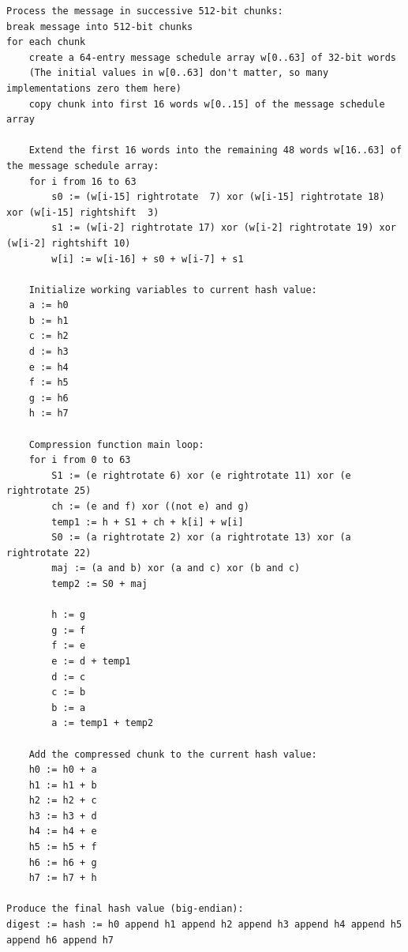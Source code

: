 \documentclass{article}
\begin{document}
\begin{lstlisting}[basicstyle=\small,breaklines=true, frame=single]
Process the message in successive 512-bit chunks:
break message into 512-bit chunks
for each chunk
    create a 64-entry message schedule array w[0..63] of 32-bit words
    (The initial values in w[0..63] don't matter, so many implementations zero them here)
    copy chunk into first 16 words w[0..15] of the message schedule array

    Extend the first 16 words into the remaining 48 words w[16..63] of the message schedule array:
    for i from 16 to 63
        s0 := (w[i-15] rightrotate  7) xor (w[i-15] rightrotate 18) xor (w[i-15] rightshift  3)
        s1 := (w[i-2] rightrotate 17) xor (w[i-2] rightrotate 19) xor (w[i-2] rightshift 10)
        w[i] := w[i-16] + s0 + w[i-7] + s1

    Initialize working variables to current hash value:
    a := h0
    b := h1
    c := h2
    d := h3
    e := h4
    f := h5
    g := h6
    h := h7

    Compression function main loop:
    for i from 0 to 63
        S1 := (e rightrotate 6) xor (e rightrotate 11) xor (e rightrotate 25)
        ch := (e and f) xor ((not e) and g)
        temp1 := h + S1 + ch + k[i] + w[i]
        S0 := (a rightrotate 2) xor (a rightrotate 13) xor (a rightrotate 22)
        maj := (a and b) xor (a and c) xor (b and c)
        temp2 := S0 + maj

        h := g
        g := f
        f := e
        e := d + temp1
        d := c
        c := b
        b := a
        a := temp1 + temp2

    Add the compressed chunk to the current hash value:
    h0 := h0 + a
    h1 := h1 + b
    h2 := h2 + c
    h3 := h3 + d
    h4 := h4 + e
    h5 := h5 + f
    h6 := h6 + g
    h7 := h7 + h

Produce the final hash value (big-endian):
digest := hash := h0 append h1 append h2 append h3 append h4 append h5 append h6 append h7
\end{lstlisting}
\end{document}
